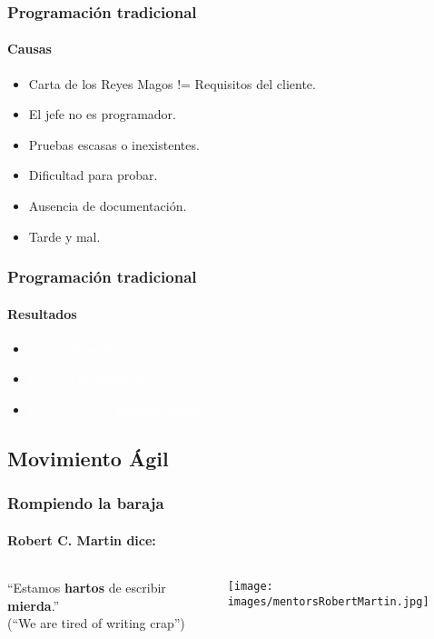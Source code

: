    \begin{frame}
    \frametitle{Programación tradicional}
    \framesubtitle{Causas}


    \begin{itemize}
     \item<1-> Carta de los Reyes Magos != Requisitos del cliente.
     \item<2-> El jefe no es programador.
     \item<3-> Pruebas escasas o inexistentes.
     \item<4-> Dificultad para probar.
     \item<5-> Ausencia de documentación.
     \item<6-> Tarde y mal.
    \end{itemize}
   \end{frame}

   {

   \begin{frame}
    \frametitle{Programación tradicional}
    \framesubtitle{Resultados}

    \begin{itemize}
     \item \textcolor{white}{Jefes \textbf{cabreados}.}
     \item \textcolor{white}{Clientes \textbf{descontentos}.}
     \item \textcolor{white}{Programadores \textbf{desmotivados}.}
    \end{itemize}
   \end{frame}
   }

  \subsection{Movimiento Ágil}


  \begin{frame}
   \frametitle{Rompiendo la baraja}
   \framesubtitle{Robert C. Martin dice:}

   \begin{columns}
    \begin{column}{7cm}
     \begin{center}
    ``Estamos \textbf{hartos} de escribir \textbf{mierda}.''\\[3pc]
    (``We are tired of writing crap'')
     \end{center}
    \end{column}
    \begin{column}{4cm}
      \texttt{[image: images/mentorsRobertMartin.jpg]}
    \end{column}
   \end{columns}
  \end{frame}


